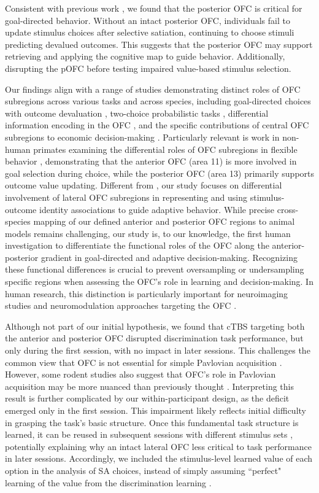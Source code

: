 \documentclass[lineno,sn-basic]{sn-jnl}%
\begin{document}
Consistent with previous work \citep{HowRey2020}, we found that the posterior OFC is critical for goal-directed behavior. Without an intact posterior OFC, individuals fail to update stimulus choices after selective satiation, continuing to choose stimuli predicting devalued outcomes. This suggests that the posterior OFC may support retrieving and applying the cognitive map to guide behavior. Additionally, disrupting the pOFC before testing impaired value-based stimulus selection.

Our findings align with a range of studies demonstrating distinct roles of OFC subregions across various tasks and across species, including goal-directed choices with outcome devaluation \citep{RN530}, two-choice probabilistic tasks \citep{RN636}, differential information encoding in the OFC \citep{RN637}, and the specific contributions of central OFC subregions to economic decision-making \citep{RN531}. Particularly relevant is work in non-human primates examining the differential roles of OFC subregions in flexible behavior \citep{RN530}, demonstrating that the anterior OFC (area 11) is more involved in goal selection during choice, while the posterior OFC (area 13) primarily supports outcome value updating. Different from \cite{RN530}, our study focuses on differential involvement of lateral OFC subregions in representing and using stimulus-outcome identity associations to guide adaptive behavior. While precise cross-species mapping of our defined anterior and posterior OFC regions to animal models remains challenging, our study is, to our knowledge, the first human investigation to differentiate the functional roles of the OFC along the anterior-posterior gradient in goal-directed and adaptive decision-making. Recognizing these functional differences is crucial to prevent oversampling or undersampling specific regions when assessing the OFC’s role in learning and decision-making. In human research, this distinction is particularly important for neuroimaging studies and neuromodulation approaches targeting the OFC \citep{RN168,HowRey2020,liuyaoatt24,RN4,RN564,oue15}.

Although not part of our initial hypothesis, we found that cTBS targeting both the anterior and posterior OFC disrupted discrimination task performance, but only during the first session, with no impact in later sessions. This challenges the common view that OFC is not essential for simple Pavlovian acquisition \citep{RN654,del07}. However, some rodent studies also suggest that OFC's role in Pavlovian acquisition may be more nuanced than previously thought \citep{RN653}. Interpreting this result is further complicated by our within-participant design, as the deficit emerged only in the first session. This impairment likely reflects initial difficulty in grasping the task's basic structure. Once this fundamental task structure is learned, it can be reused in subsequent sessions with different stimulus sets \citep{behmulwhi18,RN635}, potentially explaining why an intact lateral OFC less critical to task performance in later sessions. Accordingly, we included the stimulus-level learned value of each option in the analysis of SA choices, instead of simply assuming ``perfect" learning of the value from the discrimination learning \citep{RN530,HowRey2020}.
\end{document}
